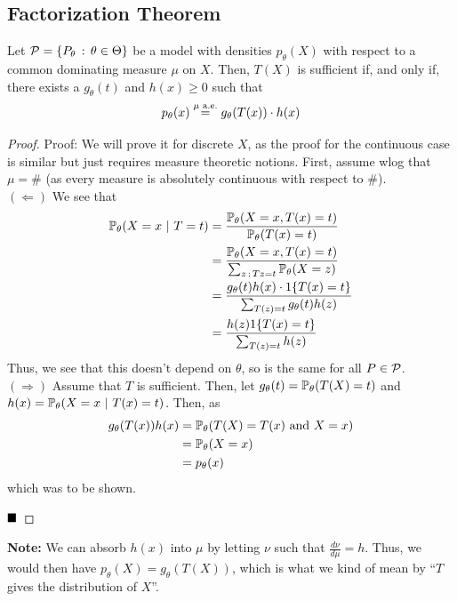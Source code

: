 \subsection*{Factorization Theorem}
\begin{theorem}
    Let $\cal{P} = \{P_{\theta} \col \theta \in \Theta\}$ be a model with densities $p_{\theta}(X)$ with respect to a common dominating measure $\mu$ on $X$. Then, $T(X)$ is sufficient if, and only if, there exists a $g_{\theta}(t)$ and $h(x) \geq 0$ such that
    \[ p_{\theta}(x) \overset{\mu \tt{ a.e.}}{=} g_{\theta}(T(x)) \cdot h(x) \]
\end{theorem}
\begin{proof}{Proof:}
    We will prove it for discrete $X$, as the proof for the continuous case is similar but just requires measure theoretic notions. First, assume wlog that $\mu = \#$ (as every measure is absolutely continuous with respect to $\#$). \\

    $(\Leftarrow)$ We see that
    \begin{align*}
        \bb{P}_{\theta}(X = x \given T = t) &= \frac{\bb{P}_{\theta}(X = x, T(x) = t)}{\bb{P}_{\theta}(T(x) = t)}\\
        &= \frac{\bb{P}_{\theta}(X = x, T(x) = t)}{\sum_{z \col Tz = t} \bb{P}_{\theta}(X = z)}\\
        &= \frac{g_{\theta}(t)h(x) \cdot 1\{T(x) = t\}}{\sum_{T(z) = t} g_{\theta}(t)h(z)}\\
        &= \frac{h(z)1\{T(x) = t\}}{\sum_{T(z) = t}h(z)}
    \end{align*}
    Thus, we see that this doesn't depend on $\theta$, so is the same for all $P \in \cal{P}$.\\

    $(\Rightarrow)$ Assume that $T$ is sufficient. Then, let $g_{\theta}(t) = \bb{P}_{\theta}(T(X) = t)$ and $h(x) = \bb{P}_{\theta}(X = x \given T(x) = t)$. Then, as
    \begin{align*}
        g_{\theta}(T(x))h(x) &= \bb{P}_{\theta}(T(X) = T(x) \text{ and } X = x)\\
        &= \bb{P}_{\theta}(X = x)\\
        &= p_{\theta}(x)
    \end{align*}
    which was to be shown.

    $\qed$
\end{proof}
\textbf{Note:} We can absorb $h(x)$ into $\mu$ by letting $\nu$ such that $\frac{d\nu}{d\mu} = h$. Thus, we would then have $p_{\theta}(X) = g_{\theta}(T(X))$, which is what we kind of mean by ``$T$ gives the distribution of $X$''.\\

